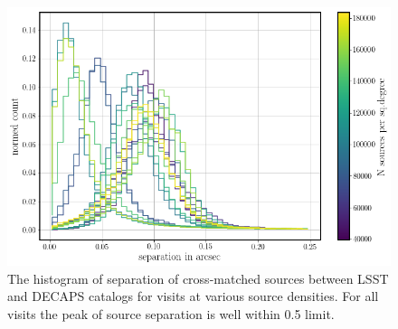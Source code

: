 \documentclass[DM,lsstdraft,toc,usenatbib]{lsstdoc}
\begin{document}



\begin{figure}
\includegraphics[width=1.0\columnwidth]{figs/13_decaps_lsst_separation_N_p_sq_deg.png}
\caption{The histogram of separation of cross-matched sources between LSST and DECAPS catalogs for visits at various source densities. For all visits the peak of source separation is well within 0.5 \arcsec limit.  }
\label{fig:separation_histogram}
\end{figure} 
\end{document}
